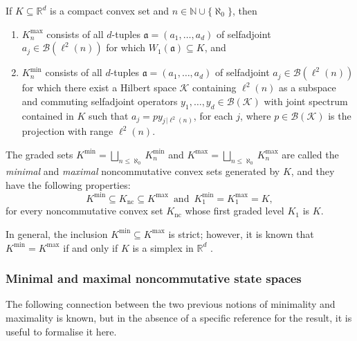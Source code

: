 \documentclass{amsart}
\theoremstyle{definition}
\theoremstyle{remark}
\newcommand{\B}{\mathcal{B}}
\newcommand{\K}{\mathcal K}
\numberwithin{equation}{section}
\begin{document}
If $K\subseteq\mathbb R^d$ is a compact convex set and $n\in\mathbb N\cup\{\aleph_0\}$, then 
\begin{enumerate}
\item $K_n^{\textrm{max}}$ consists of all $d$-tuples $\mathfrak a=(a_1,\dots,a_d)$ 
of selfadjoint $a_j\in\B(\ell^2(n))$ for which $W_1(\mathfrak a)\subseteq K$, and
\item $K_n^{\textrm{min}}$ consists of all $d$-tuples $\mathfrak a=(a_1,\dots,a_d)$ 
of selfadjoint $a_j\in\B(\ell^2(n))$ for which there exist a Hilbert space $\K$ containing $\ell^2(n)$ as a subspace and 
commuting selfadjoint operators $y_1,\dots, y_d\in\B(\K)$
with joint spectrum contained in $K$ such that $a_j=py_j{}_{\vert\ell^2(n)}$, for each $j$, 
where $p\in\B(\K)$ is the projection with range $\ell^2(n)$. 
\end{enumerate}

The graded sets $K^{\textrm{min}}=\displaystyle\bigsqcup_{n\leq\aleph_0} K_n^{\textrm{min}}$ and
$K^{\textrm{max}}=\displaystyle\bigsqcup_{n\leq\aleph_0} K_n^{\textrm{max}}$ are called the \emph{minimal} and \emph{maximal}
noncommutative convex sets generated by $K$, and they have the following properties:
\[
K^{\textrm{min}}\subseteq K_{\textrm{nc}} \subseteq K^{\textrm{max}} \,\mbox{ and }\, K_1^{\textrm{min}}=K_1^{\textrm{max}}=K,
\]
 for every noncommutative convex set $K_{\textrm{nc}}$ whose first graded level $K_1$ is $K$.

In general, the inclusion $K^{\textrm{min}}  \subseteq K^{\textrm{max}}$ is strict; however, it is known that
$K^{\textrm{min}}  = K^{\textrm{max}}$ if and only if $K$ is a simplex in $\mathbb R^d$ \cite{passer--shalit--solel2018}. 

\subsubsection{Minimal and maximal noncommutative state spaces}

The following connection between the two previous notions of minimality and maximality is known, but in the absence of a specific reference for the result, it is
useful to formalise it here.
\end{document}
